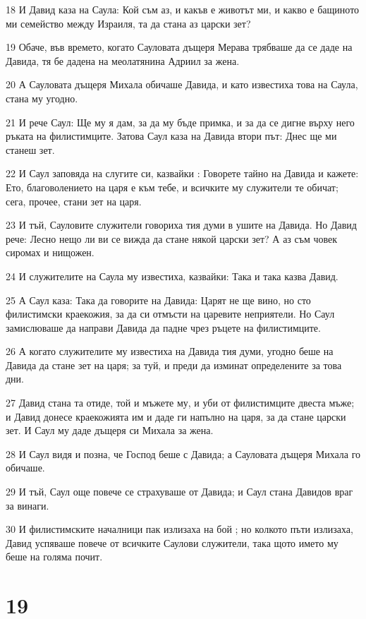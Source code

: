 \par 18 И Давид каза на Саула: Кой съм аз, и какъв е животът ми, и какво е бащиното ми семейство между Израиля, та да стана аз царски зет?
\par 19 Обаче, във времето, когато Сауловата дъщеря Мерава трябваше да се даде на Давида, тя бе дадена на меолатянина Адриил за жена.
\par 20 А Сауловата дъщеря Михала обичаше Давида, и като известиха това на Саула, стана му угодно.
\par 21 И рече Саул: Ще му я дам, за да му бъде примка, и за да се дигне върху него ръката на филистимците. Затова Саул каза на Давида втори път: Днес ще ми станеш зет.
\par 22 И Саул заповяда на слугите си, казвайки : Говорете тайно на Давида и кажете: Ето, благоволението на царя е към тебе, и всичките му служители те обичат; сега, прочее, стани зет на царя.
\par 23 И тъй, Сауловите служители говориха тия думи в ушите на Давида. Но Давид рече: Лесно нещо ли ви се вижда да стане някой царски зет? А аз съм човек сиромах и нищожен.
\par 24 И служителите на Саула му известиха, казвайки: Така и така казва Давид.
\par 25 А Саул каза: Така да говорите на Давида: Царят не ще вино, но сто филистимски краекожия, за да си отмъсти на царевите неприятели. Но Саул замислюваше да направи Давида да падне чрез ръцете на филистимците.
\par 26 А когато служителите му известиха на Давида тия думи, угодно беше на Давида да стане зет на царя; за туй, и преди да изминат определените за това дни.
\par 27 Давид стана та отиде, той и мъжете му, и уби от филистимците двеста мъже; и Давид донесе краекожията им и даде ги напълно на царя, за да стане царски зет. И Саул му даде дъщеря си Михала за жена.
\par 28 И Саул видя и позна, че Господ беше с Давида; а Сауловата дъщеря Михала го обичаше.
\par 29 И тъй, Саул още повече се страхуваше от Давида; и Саул стана Давидов враг за винаги.
\par 30 И филистимските началници пак излизаха на бой ; но колкото пъти излизаха, Давид успяваше повече от всичките Саулови служители, така щото името му беше на голяма почит.

\chapter{19}

